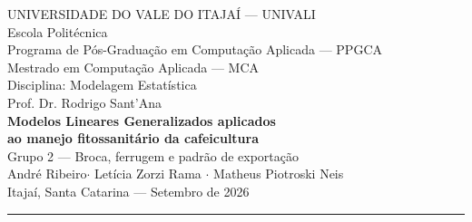 \documentclass[12pt,a4paper]{article}
\begin{document}
\begin{center}
    {\large UNIVERSIDADE DO VALE DO ITAJAÍ --- UNIVALI}\\[2pt]
    {\normalsize Escola Politécnica}\\[2pt]
    {\normalsize Programa de Pós-Graduação em Computação Aplicada --- PPGCA}\\[2pt]
    {\normalsize Mestrado em Computação Aplicada --- MCA}\\[2pt]
    {\normalsize Disciplina: Modelagem Estatística}\\[2pt]
    {\normalsize Prof. Dr. Rodrigo Sant'Ana}\\[18pt]

    {\Large\bfseries Modelos Lineares Generalizados aplicados\\
     ao manejo fitossanitário da cafeicultura}\\[6pt]
    {\large Grupo 2 --- Broca, ferrugem e padrão de exportação}\\[18pt]

    {\normalsize André Ribeiro\quad$\cdot$\quad
                 Letícia Zorzi Rama \quad$\cdot$\quad
                 Matheus Piotroski Neis}\\[14pt]

    {\normalsize Itajaí, Santa Catarina --- Setembro de 2026}
\end{center}

\vspace{6pt}
\hrule
\vspace{10pt}



\printbibliography[title={Referências}]
\end{document}
